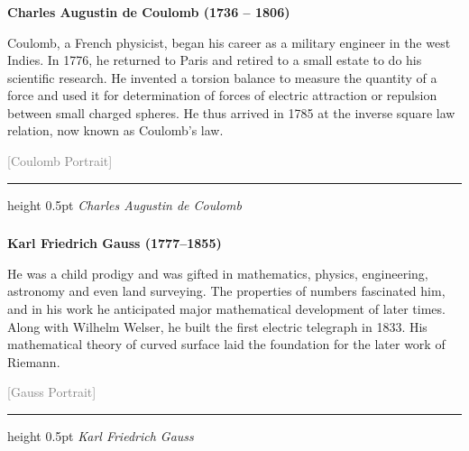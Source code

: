 \begin{frame}[t]
	\frametitle{}
	
	
	\noindent
	\textbf{Charles Augustin de Coulomb (1736 – 1806)}
	
	\vspace{0.5em}
	
	\noindent
	\begin{minipage}[t]{0.7\textwidth}
		\small
		Coulomb, a French physicist, began his career as a military engineer in the west Indies. In 1776, he returned to Paris and retired to a small estate to do his scientific research. He invented a torsion balance to measure the quantity of a force and used it for determination of forces of electric attraction or repulsion between small charged spheres. He thus arrived in 1785 at the inverse square law relation, now known as Coulomb's law.
	\end{minipage}%
	\hfill
	\begin{minipage}[t]{0.25\textwidth}
		\centering
		\textcolor{gray}{\small [Coulomb Portrait]}
		\vspace{-0.5em}
		\hrule height 0.5pt
		\vspace{0.2em}
		\scriptsize \textit{Charles Augustin de Coulomb}
	\end{minipage}
	
\end{frame}
\begin{frame}[t]
	\frametitle{}
	
	\noindent
	\textbf{Karl Friedrich Gauss (1777–1855)}
	
	\vspace{0.5em}
	
	\noindent
	\begin{minipage}[t]{0.7\textwidth}
		\small
		He was a child prodigy and was gifted in mathematics, physics, engineering, astronomy and even land surveying. The properties of numbers fascinated him, and in his work he anticipated major mathematical development of later times. Along with Wilhelm Welser, he built the first electric telegraph in 1833. His mathematical theory of curved surface laid the foundation for the later work of Riemann.
	\end{minipage}%
	\hfill
	\begin{minipage}[t]{0.25\textwidth}
		\centering
		\textcolor{gray}{\small [Gauss Portrait]}
		\vspace{-0.5em}
		\hrule height 0.5pt
		\vspace{0.2em}
		\scriptsize \textit{Karl Friedrich Gauss}
	\end{minipage}
	
\end{frame}

